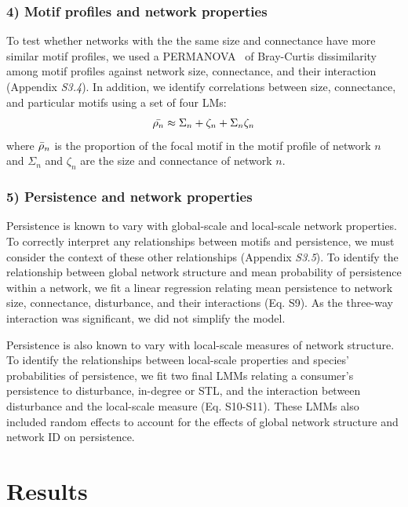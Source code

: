 \documentclass[12pt]{article}
\begin{document}
\begin{spacing}{2.0}
    \subsubsection*{4) Motif profiles and network properties}

        To test whether networks with the the same size and connectance have more similar motif profiles, we used a PERMANOVA~\citep{Anderson2001} of Bray-Curtis dissimilarity among motif profiles against network size, connectance, and their interaction (Appendix \emph{S3.4}). 
        In addition, we identify correlations between size, connectance, and particular motifs using a set of four LMs:
        \begin{equation}
            \Bar{\rho_{n}} \approx \Sigma_{n} + \zeta_{n} + \Sigma_{n}\zeta_{n}
        \label{profile_global}
        \end{equation}
        \noindent where $\Bar{\rho}_{n}$ is the proportion of the focal motif in the motif profile of network $n$ and $\Sigma_n$ and $\zeta_{n}$ are the size and connectance of network $n$.

    \subsubsection*{5) Persistence and network properties}

        Persistence is known to vary with global-scale and local-scale network properties.
        To correctly interpret any relationships between motifs and persistence, we must consider the context of these other relationships (Appendix \emph{S3.5}).
        To identify the relationship between global network structure and mean probability of persistence within a network, we fit a linear regression relating mean persistence to network size, connectance, disturbance, and their interactions (Eq. S9).
        As the three-way interaction was significant, we did not simplify the model. 


        Persistence is also known to vary with local-scale measures of network structure. 
        To identify the relationships between local-scale properties and species' probabilities of persistence, we fit two final LMMs relating a consumer's persistence to disturbance, in-degree or STL, and the interaction between disturbance and the local-scale measure (Eq. S10-S11).
        These LMMs also included random effects to account for the effects of global network structure and network ID on persistence.


\section*{Results}


\end{spacing}
\end{document}
